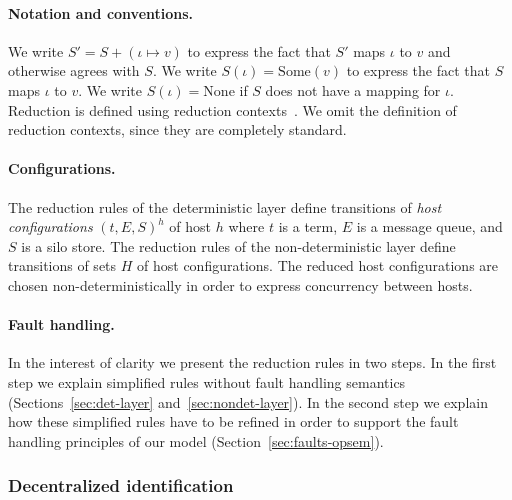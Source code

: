 \documentclass[preprint]{sigplanconf}
\theoremstyle{definition}
\theoremstyle{definition}
\begin{document}
\paragraph{Notation and conventions.} We write $S' = S + (\iota \mapsto v)$ to express the fact that $S'$ maps $\iota$ to $v$ and otherwise agrees with $S$. We write $S(\iota) = \text{Some}(v)$ to express the fact that $S$ maps $\iota$ to $v$. We write $S(\iota) = \text{None}$ if $S$ does not have a mapping for $\iota$. Reduction is defined using reduction contexts~\cite{TAPL}. We omit the definition of reduction contexts, since they are completely standard.

\paragraph{Configurations.} The reduction rules of the deterministic layer define transitions of \emph{host configurations} $(t, E, S)^h$ of host $h$ where $t$ is a term, $E$ is a message queue, and $S$ is a silo store. The reduction rules of the non-deterministic layer define transitions of sets $H$ of host configurations. The reduced host configurations are chosen non-deterministically in order to express concurrency between hosts.

\paragraph{Fault handling.} In the interest of clarity we present the reduction rules in two steps. In the first step we explain simplified rules without fault handling semantics (Sections~\ref{sec:det-layer} and~\ref{sec:nondet-layer}). In the second step we explain how these simplified rules have to be refined in order to support the fault handling principles of our model (Section~\ref{sec:faults-opsem}).


\subsubsection{Decentralized identification}
\end{document}
